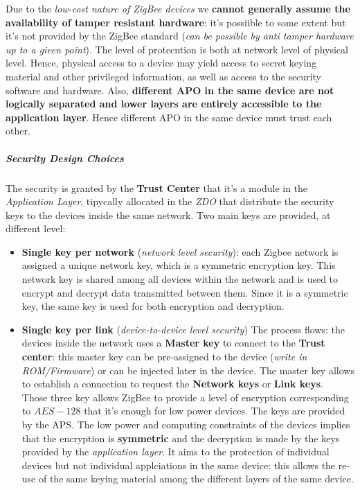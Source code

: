 \documentclass[10pt,a4paper]{report}
\theoremstyle{definition}
\begin{document}
Due to the \textit{low-cost nature of ZigBee devices} we \textbf{cannot generally assume the availability of tamper resistant hardware}: it's possiible to some extent but it's not provided by the ZigBee standard (\textit{can be possible by anti tamper hardware up to a given point}).  The level of protecntion is both at network level of physical level.  Hence, physical access to a device may yield access to secret keying material and other privileged information, as well as access to the security software and hardware. Also, \textbf{different APO in the same device are not logically separated and lower layers are entirely accessible to the application layer}. Hence different APO in the same device must trust each other.
\subparagraph{Security Design Choices}\label{sec:security-design-choices}
The security is granted by the \textbf{Trust Center} that it's a module in the \textit{Application Layer}, tipycally allocated in the \textit{ZDO} that distribute the security keys to the devices inside the same network.
Two main keys are provided, at different level:
\begin{itemize}
	\item 
	\textbf{Single key per network} (\textit{network level security}): each Zigbee network is assigned a unique network key, which is a symmetric encryption key. This network key is shared among all devices within the network and is used to encrypt and decrypt data transmitted between them. Since it is a symmetric key, the same key is used for both encryption and decryption.
	\item 
	\textbf{Single key per link} (\textit{device-to-device level security})
	The process flows: the devices inside the network uses a \textbf{Master key} to connect to the \textbf{Trust center}: this master key can be pre-assigned to the device (\textit{write in ROM/Firmware}) or can be injected later in the device. The master key allows to establish a connection to request  the \textbf{Network keys} or \textbf{Link keys}. \\ 
	Those three key allows ZigBee to provide a level of encryption corresponding to $AES-128$ that it's enough for low power devices. The keys are provided by the APS. The low power and computing constraints of the devices implies that the encryption is \textbf{symmetric} and the decryption is made by the keys provided by the \textit{application layer}.
	It aims to the protection of individual devices but not individual applciations in the same device: this allows the re-use of the same keying material among the different layers of the same device.
\end{itemize}
\end{document}
